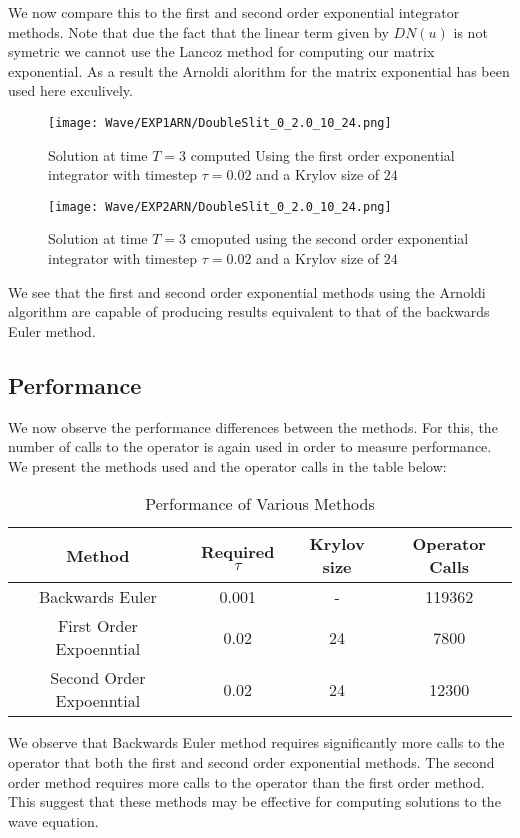 We now compare this to the first and second order exponential integrator methods.
Note that due the fact that the linear term given by $DN(u)$ is not symetric we cannot use the Lancoz method for computing our matrix exponential.
As a result the Arnoldi alorithm for the matrix exponential has been used here exculively.
\begin{figure}[H]
    \centering
    \begin{minipage}{0.49\textwidth}
        \texttt{[image: Wave/EXP1ARN/DoubleSlit\_0\_2.0\_10\_24.png]} %
        \caption{Solution at time $T=3$ computed Using the first order exponential integrator with timestep $\tau = 0.02$ and a Krylov size of $24$}
        \label{fig:second order 16}
    \end{minipage}\hfill
    \centering
    \begin{minipage}{0.49\textwidth}
        \texttt{[image: Wave/EXP2ARN/DoubleSlit\_0\_2.0\_10\_24.png]} %
        \caption{Solution at time $T=3$ cmoputed using the second order exponential integrator with timestep $\tau = 0.02$ and a Krylov size of $24$}
        \label{fig:second order 32}
    \end{minipage}\hfill
\end{figure}

We see that the first and second order exponential methods using the Arnoldi algorithm are capable of producing results equivalent to that of the backwards Euler method.

\subsection{Performance}
We now observe the performance differences between the methods.
For this, the number of calls to the operator is again used in order to measure performance.
We present the methods used and the operator calls in the table below:

\begin{table}[H]
    \centering
    \begin{tabular}{| c | c | c | c |}
    \hline
    Method & Required $\tau$ & Krylov size & Operator Calls\\
    \hline
    Backwards Euler & 0.001 & - & 119362 \\
    First Order Expoenntial & 0.02 & 24 & 7800 \\
    Second Order Expoenntial & 0.02 & 24 & 12300 \\
    \hline
    \end{tabular}
    \caption{Performance of Various Methods}
    \label{tab:reduced_data}
\end{table}

We observe that Backwards Euler method requires significantly more calls to the operator that both the first and second order exponential methods.
The second order method requires more calls to the operator than the first order method.
This suggest that these methods may be effective for computing solutions to the wave equation.